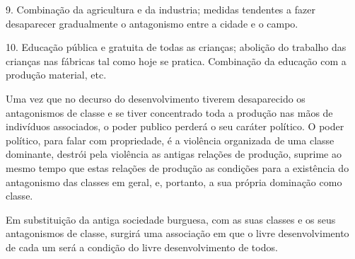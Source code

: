 9. Combinação da agricultura e da industria; medidas tendentes a fazer
desaparecer gradualmente o antagonismo entre a cidade e o campo.

10. Educação pública e gratuita de todas as crianças; abolição do
trabalho das crianças nas fábricas tal como hoje se
pratica. Combinação da educação com a produção material, etc.

Uma vez que no decurso do desenvolvimento tiverem desaparecido os
antagonismos de classe e se tiver concentrado toda a produção nas mãos
de indivíduos associados, o poder publico perderá o seu caráter
político. O poder político, para falar com propriedade, é a violência
organizada de uma classe dominante, destrói pela violência as antigas
relações de produção, suprime ao mesmo tempo que estas relações de
produção as condições para a existência do antagonismo das classes em
geral, e, portanto, a sua própria dominação como classe.

Em substituição da antiga sociedade burguesa, com as suas classes e os
seus antagonismos de classe, surgirá uma associação em que o livre
desenvolvimento de cada um será a condição do livre desenvolvimento de
todos.

\fim
